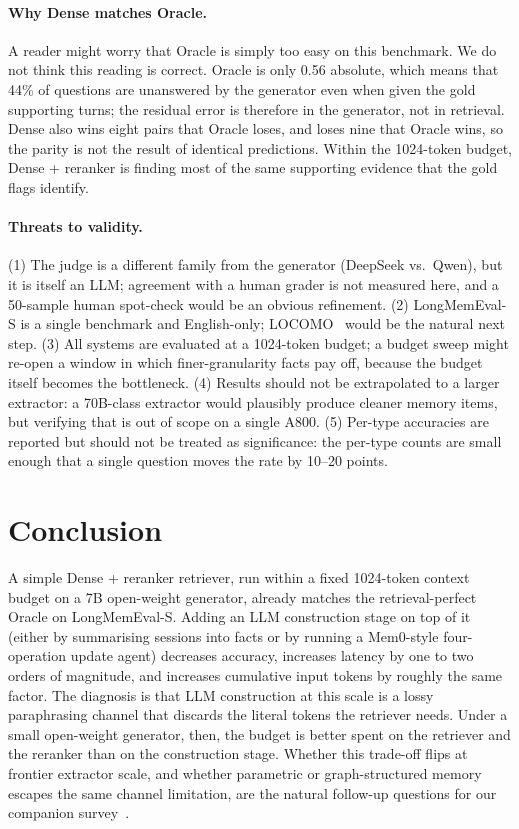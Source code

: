 \documentclass[11pt]{article}
\begin{document}
\paragraph{Why Dense matches Oracle.}
A reader might worry that Oracle is simply too easy on this
benchmark. We do not think this reading is correct. Oracle is only
0.56 absolute, which means that 44\% of questions are unanswered by
the generator even when given the gold supporting turns; the
residual error is therefore in the generator, not in retrieval.
Dense also wins eight pairs that Oracle loses, and loses nine that
Oracle wins, so the parity is not the result of identical
predictions. Within the 1024-token budget, Dense + reranker is
finding most of the same supporting evidence that the gold flags
identify.

\paragraph{Threats to validity.}
(1) The judge is a different family from the generator
(DeepSeek vs.\ Qwen), but it is itself an LLM; agreement with a
human grader is not measured here, and a 50-sample human spot-check
would be an obvious refinement. (2) LongMemEval-S is a single
benchmark and English-only;
LOCOMO~\citep{maharana2024locomo} would be the natural next step.
(3) All systems are evaluated at a 1024-token budget; a budget sweep
might re-open a window in which finer-granularity facts pay off,
because the budget itself becomes the bottleneck. (4) Results
should not be extrapolated to a larger extractor: a 70B-class
extractor would plausibly produce cleaner memory items, but
verifying that is out of scope on a single A800. (5) Per-type
accuracies are reported but should not be treated as significance:
the per-type counts are small enough that a single question moves
the rate by 10--20 points.

\section{Conclusion}
\label{sec:conclude}

A simple Dense + reranker retriever, run within a fixed
1024-token context budget on a 7B open-weight generator, already
matches the retrieval-perfect Oracle on LongMemEval-S. Adding an
LLM construction stage on top of it (either by summarising sessions
into facts or by running a Mem0-style four-operation update agent)
decreases accuracy, increases latency by one to two orders of
magnitude, and increases cumulative input tokens by roughly the
same factor. The diagnosis is that LLM construction at this scale
is a lossy paraphrasing channel that discards the literal tokens
the retriever needs. Under a small open-weight generator, then, the
budget is better spent on the retriever and the reranker than on
the construction stage. Whether this trade-off flips at frontier
extractor scale, and whether parametric or graph-structured memory
escapes the same channel limitation, are the natural follow-up
questions for our companion survey~\citep{yang2026survey}.
\end{document}

